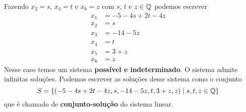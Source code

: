 \begin{exemplos}
\begin{solucao}
\begin{enumerate}
            Fazendo $x_2 = s$, $x_4 = t$ e $x_6 = z$ com $s$, $t$ e $z \in \mathbb{Q}$ podemos escrever
            \begin{align*}
                x_1 &= -5 - 4s + 2t - 4z\\
                x_2 &= s\\
                x_3 &= -14 - 5z\\
                x_4 &= t\\
                x_5 &= 3 + z\\
                x_6 &= z
            \end{align*}
            Nesse caso temos um sistema \textbf{possível e indeterminado}. O sistema admite infinitas soluç\~oes. Podemos escrever as soluç\~oes desse sistema como o conjunto
            \[
                S = \{(-5 - 4s + 2t - 4z, s, -14 - 5z, t, 3 + z, z) \mid s, t, z \in \mathbb{Q}\}
            \]
            que é chamado de \textbf{conjunto-solução} do sistema linear.


\end{enumerate}
\end{solucao}
\end{exemplos}
